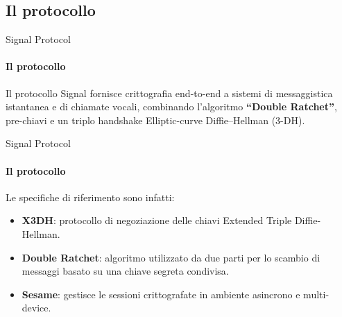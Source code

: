 \subsection{Il protocollo}

\begin{frame}{Signal Protocol}
    \framesubtitle{Il protocollo}
    Il protocollo Signal fornisce crittografia end-to-end a sistemi di messaggistica istantanea e di chiamate vocali, combinando l'algoritmo \textbf{``Double Ratchet''}, pre-chiavi e un triplo handshake Elliptic-curve Diffie–Hellman (3-DH). 
\end{frame}

\begin{frame}{Signal Protocol}
    \framesubtitle{Il protocollo}
    Le specifiche di riferimento sono infatti: \cite{signal}
    \begin{itemize}
        \item \textbf{X3DH}: protocollo di negoziazione delle chiavi Extended Triple Diffie-Hellman.\pause
        \item \textbf{Double Ratchet}: algoritmo utilizzato da due parti per lo scambio di messaggi basato su una chiave segreta condivisa. \pause
        \item \textbf{Sesame}: gestisce le sessioni crittografate in ambiente asincrono e multi-device.
    \end{itemize}
    
\end{frame}


